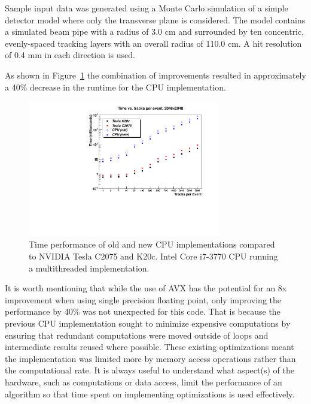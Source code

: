 \documentclass{JINST}
\begin{document}
Sample input data was generated using a Monte Carlo simulation of a simple detector model where only the transverse plane is considered.  The model contains a simulated beam pipe with a radius of 3.0 cm and surrounded by ten concentric, evenly-spaced tracking layers with an overall radius of 110.0 cm.  A hit resolution of 0.4 mm in each direction is used.

As shown in Figure~\ref{fig:TimePerformance} the combination of improvements resulted in approximately a 40\% decrease in the runtime for the CPU implementation.

\begin{figure}[!Hhtb]
\begin{center}
\includegraphics[width=0.75\textwidth]{figs/TimePerformance.pdf} 
\caption{Time performance of old and new CPU implementations compared to NVIDIA Tesla C2075 and K20c. 
 Intel Core i7-3770 CPU running a multithreaded implementation.\label{fig:TimePerformance}}
\end{center}
\end{figure}

It is worth mentioning that while the use of AVX has the potential for an 8x improvement when using single precision floating point, only improving the performance by 40\% was not unexpected for this code.  That is because the previous CPU implementation sought to minimize expensive computations by ensuring that redundant computations were moved outside of loops and intermediate results reused where possible.  These existing optimizations meant the implementation was limited more by memory access operations rather than the computational rate.  It is always useful to understand what aspect(s) of the hardware, such as computations or data access, limit the performance of an algorithm so that time spent on implementing optimizations is used effectively.
\end{document}
